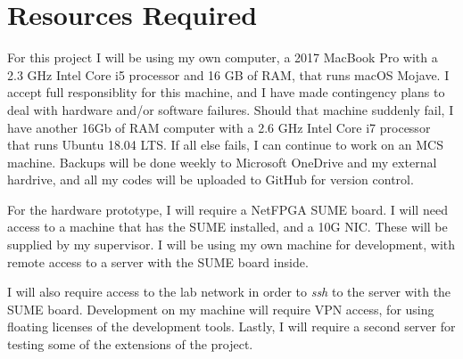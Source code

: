 \section*{\fontsize{18pt}{1}\selectfont Resources Required}

For this project I will be using my own computer, a 2017 MacBook Pro with a 2.3 GHz Intel Core i5 processor and 16 GB of RAM, that runs macOS Mojave. I accept full responsiblity for this machine, and I have made contingency plans to deal with hardware and/or software failures. Should that machine suddenly fail, I have another 16Gb of RAM computer with a 2.6 GHz Intel Core i7 processor that runs Ubuntu 18.04 LTS. If all else fails, I can continue to work on an MCS machine. Backups will be done weekly to Microsoft OneDrive and my external hardrive, and all my codes will be uploaded to GitHub for version control. 

For the hardware prototype, I will require a NetFPGA SUME board. I will need access to a machine that has the SUME installed, and a 10G NIC. These will be supplied by my supervisor. I will be using my own machine for development, with remote access to a server with the SUME board inside.

I will also require access to the lab network in order to \emph{ssh} to the server with the SUME board. Development on my machine will require VPN access, for using floating licenses of the development tools. Lastly, I will require a second server for testing some of the extensions of the project.